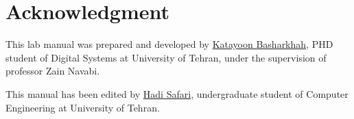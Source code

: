 \documentclass[12pt, logo=tehranDLDL/ut]{tehranDLDL}
\begin{document}
\section*{Acknowledgment}

This lab manual was prepared and developed by \href{mailto:ktbasharkhah@gmail.com?subject=[DLDLab]\%20}{Katayoon Basharkhah}, PHD student of Digital Systems at University of Tehran, under the supervision of professor Zain Navabi.

This manual has been edited by \href{mailto:hadi.safari@ut.ac.ir?subject=[DLDLab]\%20}{Hadi Safari}, undergraduate student of Computer Engineering at University of Tehran.
\end{document}
